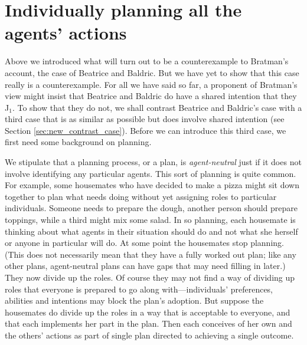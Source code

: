 \documentclass[12pt,\papersize]{extarticle}
\begin{document}
\section{Individually planning all  the agents' actions}
\label{sec:distributed_plan}

Above we introduced what will turn out to be a counterexample to Bratman's account, the case of Beatrice and Baldric. 
But we have yet to show that this case really is a counterexample. 
For all we have said so far, a proponent of Bratman's view might insist that Beatrice and Baldric do have a shared intention that they J$_1$.
To show that they do not,
we shall contrast Beatrice and Baldric's case with a third case that is as similar as possible but does involve shared intention (see Section \vref{sec:new_contrast_case}). 
Before we can introduce this third case,
we first need some background on planning.




We stipulate that a planning process, or a plan, is \emph{agent-neutral} just if it does not involve identifying any particular agents.  
This sort of planning is quite common.
For example, some housemates who have decided to make a pizza might sit down together to plan what needs doing without yet assigning roles to particular individuals. 
Someone needs to prepare the dough, 
another person should prepare toppings,
while a third might mix some salad.
In so planning, each housemate is thinking about what 
agents in their situation should do 
and not what she herself or anyone in particular will do.  
At some point the housemates stop planning.
(This does not necessarily mean that they have a fully worked out plan; like any other plans, agent-neutral plans can have gaps that may need filling in later.)
They now divide up the roles.
Of course they may not find a way of dividing up roles that everyone is prepared to go along with---individuals' preferences, abilities and intentions may block the plan's adoption.
But suppose the housemates do divide up the roles in a way that is acceptable to everyone, 
	and that each implements her part in the plan.
Then each conceives of her own and the others' actions as part of single plan directed to achieving a single outcome.
\end{document}
